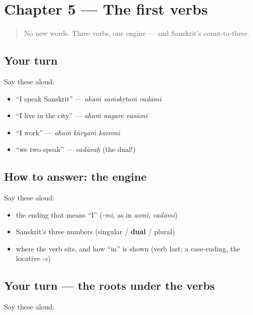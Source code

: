 \section[Practice]{Chapter 5 — The first verbs}

\label{lesson:SA-C05-practice}



\begin{quote}
No new words. Three verbs, one engine — and Sanskrit's count-to-three.
\end{quote}

\subsection*{Your turn}
Say these aloud:

\begin{itemize}
\raggedright
  \item \textquotedblleft{}I speak Sanskrit\textquotedblright{} — \emph{ahaṁ saṁskṛtaṁ vadāmi}
  \item \textquotedblleft{}I live in the city\textquotedblright{} — \emph{ahaṁ nagare vasāmi}
  \item \textquotedblleft{}I work\textquotedblright{} — \emph{ahaṁ kāryaṁ karomi}
  \item \textquotedblleft{}we two speak\textquotedblright{} — \emph{vadāvaḥ} (the dual!)
\end{itemize}

\subsection*{How to answer: the engine}
Say these aloud:

\begin{itemize}
\raggedright
  \item the ending that means \textquotedblleft{}I\textquotedblright{} (\emph{-mi}, as in \emph{asmi}, \emph{vadāmi})
  \item Sanskrit's three numbers (singular / \textbf{dual} / plural)
  \item where the verb sits, and how \textquotedblleft{}in\textquotedblright{} is shown (verb last; a case-ending, the locative \emph{-e})
\end{itemize}

\subsection*{Your turn — the roots under the verbs}
Say these aloud:


